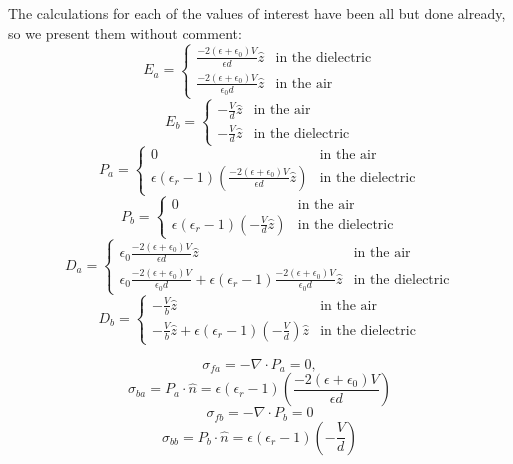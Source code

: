 \documentclass{article}
\begin{document}
The calculations for each of the values of interest have been all but done already, so we present them without comment:
\[E_a=\begin{cases}
    \frac{-2(\epsilon+\epsilon_0) V}{\epsilon d}\hat{z} & \textrm{in the dielectric} \\
    \frac{-2(\epsilon + \epsilon_0) V}{\epsilon_0 d}\hat{z} & \textrm{in the air}

  \end{cases} \]
\[E_b = \begin{cases}
    -\frac{V}{d}\hat{z} & \textrm{in the air} \\
    -\frac{V}{d}\hat{z} & \textrm{in the dielectric}
  \end{cases}\]
\[P_a=\begin{cases}
    0 & \textrm{in the air} \\
    \epsilon(\epsilon_r-1)\left( \frac{-2(\epsilon+\epsilon_0) V}{\epsilon d}\hat{z}\right) & \textrm{in the dielectric}
  \end{cases}\]
\[P_b=\begin{cases}
    0 & \textrm{in the air} \\
    \epsilon(\epsilon_r-1)\left( -\frac{V}{d}\hat{z} \right) & \textrm{in the dielectric}
  \end{cases}\]
\[D_a=\begin{cases}
    \epsilon_0\frac{-2(\epsilon+\epsilon_0) V}{\epsilon d}\hat{z} & \textrm{in the air} \\
    \epsilon_0\frac{-2(\epsilon+\epsilon_0) V}{\epsilon_0 d}+\epsilon(\epsilon_r-1)\frac{-2(\epsilon+\epsilon_0) V}{\epsilon_0 d}\hat{z} & \textrm{in the dielectric}
  \end{cases}\]
\[D_b=\begin{cases}
    -\frac{V}{b}\hat{z} & \textrm{in the air} \\
    -\frac{V}{b}\hat{z}+\epsilon(\epsilon_r-1)\left( -\frac{V}{d}\right)\hat{z} & \textrm{in the dielectric}
  \end{cases}\]

\[\sigma_{fa}=-\nabla\cdot P_a=0, \]
\[\sigma_{ba}=P_a\cdot\hat{n}=\epsilon(\epsilon_r-1)\left( \frac{-2(\epsilon+\epsilon_0)V}{\epsilon d} \right)\]
\[\sigma_{fb}=-\nabla\cdot P_b=0\]
\[\sigma_{bb}=P_b\cdot \hat{n}=\epsilon(\epsilon_r-1)\left(-\frac{V}{d}\right)\]
\end{document}
